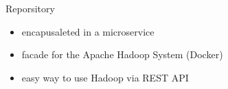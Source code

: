 \begin{frame}{Reporsitory}
	\begin{itemize}
	\item encapusaleted in a microservice
	\item facade for the Apache Hadoop System (Docker)
	\item easy way to use Hadoop via REST API
	\end{itemize}
\end{frame}